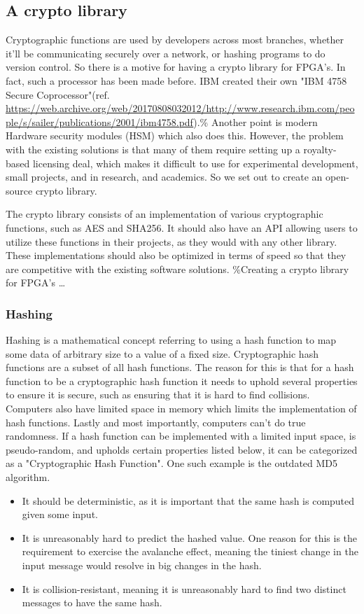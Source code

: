 \documentclass[a4paper]{article}
\begin{document}
\subsection{A crypto library}
\label{sec:orgd889226}
Cryptographic functions are used by developers across most branches, whether it'll be communicating securely over a network, or hashing programs to do version control.
So there is a motive for having a crypto library for FPGA's. In fact, such a processor has been made before. IBM created their own "IBM 4758 Secure Coprocessor"(ref. \url{https://web.archive.org/web/20170808032012/http://www.research.ibm.com/people/s/sailer/publications/2001/ibm4758.pdf}).\% Another point is modern Hardware security modules (HSM) which also does this.
However, the problem with the existing solutions is that many of them require setting up a royalty-based licensing deal, which makes it difficult to use for experimental development, small projects, and in research, and academics.
So we set out to create an open-source crypto library.

The crypto library consists of an implementation of various cryptographic functions, such as AES and SHA256. It should also have an API allowing users to utilize these functions in their projects, as they would with any other library.
These implementations should also be optimized in terms of speed so that they are competitive with the existing software solutions.
\%Creating a crypto library for FPGA's \ldots{}
\subsubsection{Hashing}
\label{sec:org14e4686}
Hashing is a mathematical concept referring to using a hash function to map some data of arbitrary size to a value of a fixed size. Cryptographic hash functions are a subset of all hash functions.
The reason for this is that for a hash function to be a cryptographic hash function it needs to uphold several properties to ensure it is secure, such as ensuring that it is hard to find collisions. Computers also have limited space in memory which limits the implementation of hash functions. Lastly and most importantly, computers can't do true randomness.
If a hash function can be implemented with a limited input space, is pseudo-random, and upholds certain properties listed below, it can be categorized as a "Cryptographic Hash Function". One such example is the outdated MD5 algorithm.
\begin{itemize}
\item It should be deterministic, as it is important that the same hash is computed given some input.
\item It is unreasonably hard to predict the hashed value. One reason for this is the requirement to exercise the avalanche effect, meaning the tiniest change in the input message would resolve in big changes in the hash.
\item It is collision-resistant, meaning it is unreasonably hard to find two distinct messages to have the same hash.
\end{itemize}
\end{document}
